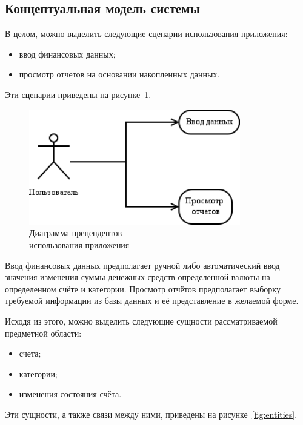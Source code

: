 \pagebreak
\subsection{Концептуальная модель системы}

В целом, можно выделить следующие сценарии использования приложения:
\begin{itemize}
  \item ввод финансовых данных;
  \item просмотр отчетов на основании накопленных данных.
\end{itemize}

Эти сценарии приведены на рисунке~\ref{fig:use_cases}.

\begin{figure}[h!]
  \centering
  \includegraphics[width=92mm]{pic/use_cases}
  \caption{Диаграмма прецендентов \\ использования приложения}
  \label{fig:use_cases}
\end{figure}

Ввод финансовых данных предполагает ручной либо автоматический ввод
значения изменения суммы денежных средств определенной валюты
на определенном счёте и категории.
Просмотр отчётов предполагает выборку требуемой информации из базы
данных и её представление в желаемой форме.

Исходя из этого, можно выделить следующие сущности рассматриваемой
предметной области:
\begin{itemize}
\item счета;
\item категории;
\item изменения состояния счёта.
\end{itemize}

Эти сущности, а также связи между ними, приведены на рисунке~\ref{fig:entities}.

